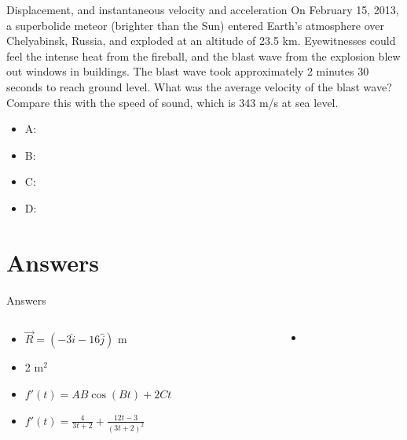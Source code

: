 \documentclass{beamer}
\begin{document}
\begin{frame}{Displacement, and instantaneous velocity and acceleration}
\small
On February 15, 2013, a superbolide meteor (brighter than the Sun) entered Earth’s atmosphere over Chelyabinsk, Russia, and exploded at an altitude of 23.5 km. Eyewitnesses could feel the intense heat from the fireball, and the blast wave from the explosion blew out windows in buildings. The blast wave took approximately 2 minutes 30 seconds to reach ground level.  What was the average velocity of the blast wave?  Compare this with the speed of sound, which is 343 m/s at sea level.
\begin{itemize}
\item A: 
\item B: 
\item C: 
\item D: 
\end{itemize}
\end{frame}

\section{Answers}

\begin{frame}{Answers}
\begin{columns}[T]
\begin{column}{0.5\textwidth}
\begin{itemize}
\item $\vec{R} =  (-3\hat{i}-16\hat{j})$ m
\item 2 m$^2$
\item $f'(t) = AB\cos(Bt) + 2Ct$
\item $f'(t) = \frac{4}{3t+2}+\frac{12t-3}{(3t+2)^2}$
\end{itemize}
\end{column}
\begin{column}{0.5\textwidth}
\begin{itemize}
\item 
\end{itemize}
\end{column}
\end{columns}
\end{frame}
\end{document}
